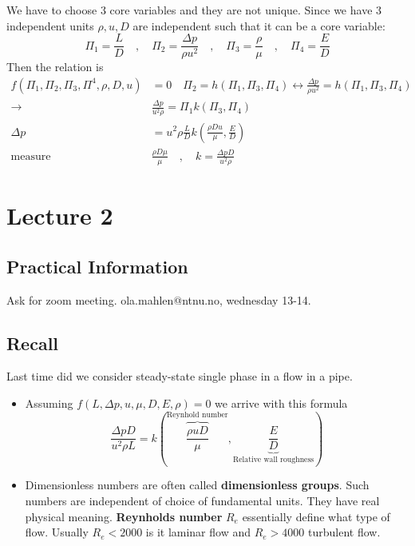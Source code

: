 \documentclass{article}
\theoremstyle{remark}
\begin{document}
We have to choose $3$ core variables and they are not unique.  Since we have $3$ independent units $\rho , u, D$ are independent such that it can be a core variable: \[
\Pi _{1} = \frac{L}{D} \quad , \quad  \Pi _{2} = \frac{\Delta p}{\rho u^2} \quad , \quad \Pi _{3} = \frac{\rho}{\mu} \quad , \quad  \Pi _{4} = \frac{E}{D}    
\] 
Then the relation is \[
  \begin{split}
    f\left( \Pi _{1}, \Pi _{2} , \Pi _3, \Pi ^{4},\rho, D, u \right) &= 0  \quad  \Pi _{2} = h\left( \Pi _{1}, \Pi _{3}, \Pi _{4} \right) \leftrightarrow \frac{\Delta p}{\rho u^2} = h\left( \Pi _{1}, \Pi _3 , \Pi _{4} \right) \\
    \to  & \frac{\Delta p}{ u^2 \rho} = \Pi _{1} k\left( \Pi _{3}, \Pi _{4} \right)\\
    \Delta p &= u^2 \rho \frac{L}{D} k \left( \frac{\rho D u}{\mu}, \frac{E}{D} \right)   \\
    \text{measure} \quad & \frac{\rho D \mu}{ \mu} \quad ,\quad    k= \frac{\Delta p D }{u^2\rho}
  \end{split}
\]
\newpage
\section{Lecture 2}%
\label{sec:lecture_2}
\subsection{Practical Information}%
\label{sub:practical_information}

Ask for zoom meeting. ola.mahlen@ntnu.no, wednesday 13-14.

\subsection{Recall}%
\label{sub:repetition}

Last time did we consider steady-state single phase in a flow  in a pipe.
\begin{itemize}
  \item Assuming $f\left( L, \Delta p, u, \mu , D ,E , \rho \right) = 0$ we arrive with this formula \[
  \frac{\Delta p D}{u^{2} \rho L}  = k \left( \overbrace{\frac{\rho u D}{\mu }}^\text{Reynhold number}  , \underbrace{\frac{E}{D}}_\text{Relative wall roughness}  \right)
  \] 
\item Dimensionless numbers are often called \textbf{dimensionless groups}. Such numbers are independent of choice of fundamental units. They have real physical meaning. \textbf{Reynholds number}  $R_{e} $ essentially define what type of flow. Usually $R_{e} < 2000$ is it laminar flow and $R_{e} > 4000$ turbulent flow.
\end{itemize}
\end{document}
